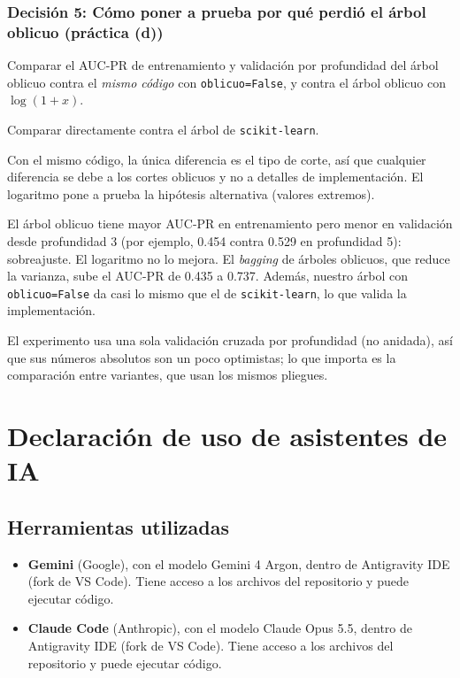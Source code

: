 \documentclass[11pt, letterpaper]{article}
\begin{document}
\subsubsection*{Decisión 5: Cómo poner a prueba por qué perdió el árbol oblicuo (práctica (d))}
\begin{description}[leftmargin=0pt, itemsep=2pt]
    \item[Decisión.] Comparar el AUC-PR de entrenamiento y validación por profundidad del árbol oblicuo contra el \emph{mismo código} con \texttt{oblicuo=False}, y contra el árbol oblicuo con $\log(1 + x)$.
    \item[Alternativa descartada.] Comparar directamente contra el árbol de \texttt{scikit-learn}.
    \item[Por qué.] Con el mismo código, la única diferencia es el tipo de corte, así que cualquier diferencia se debe a los cortes oblicuos y no a detalles de implementación. El logaritmo pone a prueba la hipótesis alternativa (valores extremos).
    \item[Evidencia.] El árbol oblicuo tiene mayor AUC-PR en entrenamiento pero menor en validación desde profundidad 3 (por ejemplo, 0.454 contra 0.529 en profundidad 5): sobreajuste. El logaritmo no lo mejora. El \emph{bagging} de árboles oblicuos, que reduce la varianza, sube el AUC-PR de 0.435 a 0.737. Además, nuestro árbol con \texttt{oblicuo=False} da casi lo mismo que el de \texttt{scikit-learn}, lo que valida la implementación.
    \item[Qué perdemos.] El experimento usa una sola validación cruzada por profundidad (no anidada), así que sus números absolutos son un poco optimistas; lo que importa es la comparación entre variantes, que usan los mismos pliegues.
\end{description}

\clearpage
\section*{Declaración de uso de asistentes de IA}
\newcommand{\pendiente}[1]{\textcolor{red}{[#1]}}

\subsection*{Herramientas utilizadas}
\begin{itemize}
    \item \textbf{Gemini} (Google), con el modelo Gemini 4 Argon, dentro de Antigravity IDE (fork de VS Code). Tiene acceso a los archivos del repositorio y puede ejecutar código.
    \item \textbf{Claude Code} (Anthropic), con el modelo Claude Opus 5.5, dentro de Antigravity IDE (fork de VS Code). Tiene acceso a los archivos del repositorio y puede ejecutar código.
\end{itemize}
\end{document}

